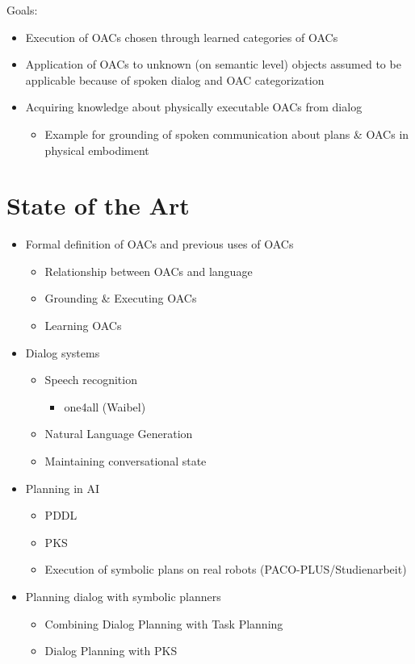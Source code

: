 \documentclass[english,ngerman]{KITreprt}
\begin{document}
Goals:
\begin{itemize}
    \item Execution of OACs chosen through learned categories of OACs
    \item Application of OACs to unknown (on semantic level) objects assumed to be
        applicable because of spoken dialog and OAC categorization
    \item Acquiring knowledge about physically executable OACs from dialog
        \begin{itemize}
            \item Example for grounding of spoken communication about plans \& OACs
                in physical embodiment
        \end{itemize}
\end{itemize}

\chapter{State of the Art}
\begin{itemize}
    \item Formal definition of OACs and previous uses of OACs
        \begin{itemize}
            \item Relationship between OACs and language
            \item Grounding \& Executing OACs
            \item Learning OACs
        \end{itemize}
    \item Dialog systems
        \begin{itemize}
            \item Speech recognition
                \begin{itemize}
                    \item one4all (Waibel)
                \end{itemize}
            \item Natural Language Generation
            \item Maintaining conversational state
        \end{itemize}
    \item Planning in AI
        \begin{itemize}
            \item PDDL
            \item PKS
            \item Execution of symbolic plans on real robots (PACO-PLUS/Studienarbeit)
        \end{itemize}
    \item Planning dialog with symbolic planners
        \begin{itemize}
            \item Combining Dialog Planning with Task Planning
            \item Dialog Planning with PKS
        \end{itemize}
\end{itemize}
\end{document}
